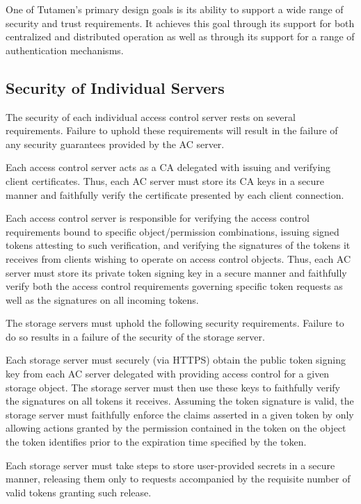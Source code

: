 One of Tutamen's primary design goals is its ability to support a wide
range of security and trust requirements. It achieves this goal
through its support for both centralized and distributed operation as
well as through its support for a range of authentication mechanisms.

\subsection{Security of Individual Servers}

The security of each individual access control server rests on several
requirements. Failure to uphold these requirements will result in the
failure of any security guarantees provided by the AC server.

\begin{packed_desc}
\item[Certificate Authority Role:] Each access control server acts as
  a CA delegated with issuing and verifying client certificates. Thus,
  each AC server must store its CA keys in a secure manner and
  faithfully verify the certificate presented by each client
  connection.
\item[Token Issuance and Verification:] Each access control server is
  responsible for verifying the access control requirements bound to
  specific object/permission combinations, issuing signed tokens
  attesting to such verification, and verifying the signatures of the
  tokens it receives from clients wishing to operate on access control
  objects. Thus, each AC server must store its private token signing
  key in a secure manner and faithfully verify both the access control
  requirements governing specific token requests as well as the
  signatures on all incoming tokens.
\end{packed_desc}

The storage servers must uphold the following security
requirements. Failure to do so results in a failure of the security of
the storage server.

\begin{packed_desc}
\item[Token Verification:] Each storage server must securely (via
  HTTPS) obtain the public token signing key from each AC server
  delegated with providing access control for a given storage
  object. The storage server must then use these keys to faithfully
  verify the signatures on all tokens it receives. Assuming the token
  signature is valid, the storage server must faithfully enforce the
  claims asserted in a given token by only allowing actions granted by
  the permission contained in the token on the object the token
  identifies prior to the expiration time specified by the token.
\item[Secure Storage:] Each storage server must take steps to store
  user-provided secrets in a secure manner, releasing them only to
  requests accompanied by the requisite number of valid tokens
  granting such release.
\end{packed_desc}

